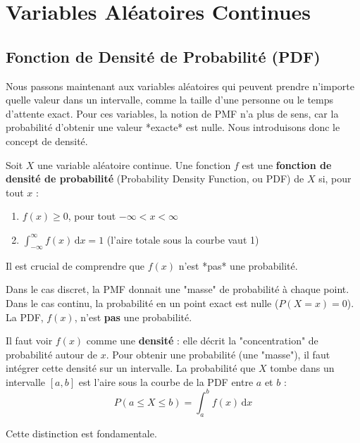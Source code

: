 \newpage

\section{Variables Aléatoires Continues}

\subsection{Fonction de Densité de Probabilité (PDF)}

Nous passons maintenant aux variables aléatoires qui peuvent prendre n'importe quelle valeur dans un intervalle, comme la taille d'une personne ou le temps d'attente exact. Pour ces variables, la notion de PMF n'a plus de sens, car la probabilité d'obtenir une valeur *exacte* est nulle. Nous introduisons donc le concept de densité.

\begin{definitionbox}
Soit $X$ une variable aléatoire continue. Une fonction $f$ est une \textbf{fonction de densité de probabilité} (Probability Density Function, ou PDF) de $X$ si, pour tout $x$ :
\begin{enumerate}
    \item $f(x) \ge 0$, pour tout $-\infty < x < \infty$
    \item $\int_{-\infty}^{\infty} f(x) \, \mathrm{d}x = 1$ (l'aire totale sous la courbe vaut 1)
\end{enumerate}
\end{definitionbox}

Il est crucial de comprendre que $f(x)$ n'est *pas* une probabilité.

\begin{intuitionbox}
Dans le cas discret, la PMF donnait une "masse" de probabilité à chaque point. Dans le cas continu, la probabilité en un point exact est nulle ($P(X=x)=0$). La PDF, $f(x)$, n'est \textbf{pas} une probabilité.

Il faut voir $f(x)$ comme une \textbf{densité} : elle décrit la "concentration" de probabilité autour de $x$. Pour obtenir une probabilité (une "masse"), il faut intégrer cette densité sur un intervalle. La probabilité que $X$ tombe dans un intervalle $[a, b]$ est l'aire sous la courbe de la PDF entre $a$ et $b$ :
$$ P(a \le X \le b) = \int_a^b f(x) \, \mathrm{d}x $$
\end{intuitionbox}

Cette distinction est fondamentale.

